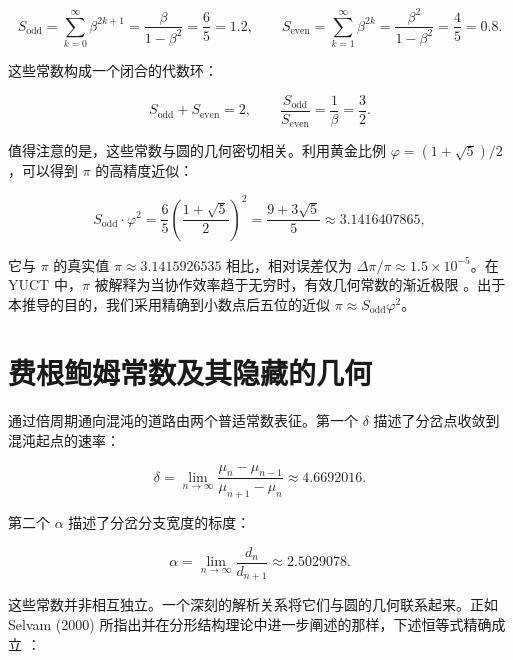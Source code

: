 \documentclass[12pt,a4paper]{article}
\begin{document}
	\begin{equation}
		S_{\mathrm{odd}} = \sum_{k=0}^{\infty} \beta^{2k+1} = \frac{\beta}{1-\beta^2} = \frac{6}{5} = 1.2, \qquad
		S_{\mathrm{even}} = \sum_{k=1}^{\infty} \beta^{2k} = \frac{\beta^2}{1-\beta^2} = \frac{4}{5} = 0.8.
	\end{equation}
	
	这些常数构成一个闭合的代数环：
	
	\begin{equation}
		S_{\mathrm{odd}} + S_{\mathrm{even}} = 2, \qquad \frac{S_{\mathrm{odd}}}{S_{\mathrm{even}}} = \frac{1}{\beta} = \frac{3}{2}.
	\end{equation}
	
	值得注意的是，这些常数与圆的几何密切相关。利用黄金比例 \(\varphi = (1+\sqrt{5})/2\)，可以得到 \(\pi\) 的高精度近似：
	
	\begin{equation}
		S_{\mathrm{odd}} \cdot \varphi^2 = \frac{6}{5} \left( \frac{1+\sqrt{5}}{2} \right)^2 = \frac{9+3\sqrt{5}}{5} \approx 3.1416407865,
	\end{equation}
	
	它与 \(\pi\) 的真实值 \(\pi \approx 3.1415926535\) 相比，相对误差仅为 \(\Delta\pi/\pi \approx 1.5 \times 10^{-5}\)。在 YUCT 中，\(\pi\) 被解释为当协作效率趋于无穷时，有效几何常数的渐近极限 \cite{AppendixEhrenfest}。出于本推导的目的，我们采用精确到小数点后五位的近似 \(\pi \approx S_{\mathrm{odd}}\varphi^2\)。
	
	\section{费根鲍姆常数及其隐藏的几何}
	
	通过倍周期通向混沌的道路由两个普适常数表征。第一个 \(\delta\) 描述了分岔点收敛到混沌起点的速率：
	
	\begin{equation}
		\delta = \lim_{n\to\infty} \frac{\mu_n - \mu_{n-1}}{\mu_{n+1} - \mu_n} \approx 4.6692016.
	\end{equation}
	
	第二个 \(\alpha\) 描述了分岔分支宽度的标度：
	
	\begin{equation}
		\alpha = \lim_{n\to\infty} \frac{d_n}{d_{n+1}} \approx 2.5029078.
	\end{equation}
	
	这些常数并非相互独立。一个深刻的解析关系将它们与圆的几何联系起来。正如 Selvam (2000) 所指出并在分形结构理论中进一步阐述的那样，下述恒等式精确成立 \cite{Selvam2000}：
	
\end{document}
